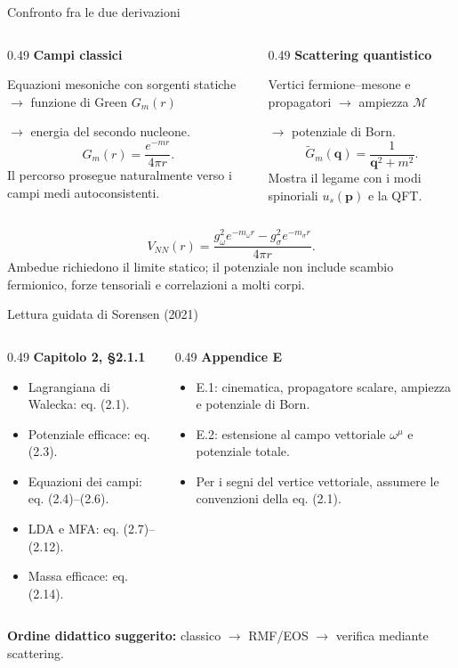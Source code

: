 \begin{frame}{Confronto fra le due derivazioni}
\small
\begin{columns}[T,onlytextwidth]
\begin{column}{0.49\textwidth}
\textbf{Campi classici}\par\smallskip
Equazioni mesoniche con sorgenti statiche
\(\rightarrow\) funzione di Green \(G_m(r)\)\par
\(\rightarrow\) energia del secondo nucleone.
\[
G_m(r)=\frac{e^{-mr}}{4\pi r}.
\]
Il percorso prosegue naturalmente verso
i campi medi autoconsistenti.
\end{column}
\begin{column}{0.49\textwidth}
\textbf{Scattering quantistico}\par\smallskip
Vertici fermione--mesone e propagatori
\(\rightarrow\) ampiezza \(\mathcal M\)\par
\(\rightarrow\) potenziale di Born.
\[
\widetilde G_m(\mathbf q)=\frac1{\mathbf q^2+m^2}.
\]
Mostra il legame con i modi spinoriali
\(u_s(\mathbf p)\) e la QFT.
\end{column}
\end{columns}
\medskip
\[
V_{NN}(r)=\frac{g_\omega^2e^{-m_\omega r}
-g_\sigma^2e^{-m_\sigma r}}{4\pi r}.
\]
Ambedue richiedono il limite statico; il potenziale non include scambio
fermionico, forze tensoriali e correlazioni a molti corpi.
\end{frame}

\begin{frame}{Lettura guidata di Sorensen (2021)}
\small
\begin{columns}[T,onlytextwidth]
\begin{column}{0.49\textwidth}
\textbf{Capitolo 2, \S 2.1.1}\par\smallskip
\begin{itemize}
\item Lagrangiana di Walecka: eq. (2.1).
\item Potenziale efficace: eq. (2.3).
\item Equazioni dei campi: eq. (2.4)--(2.6).
\item LDA e MFA: eq. (2.7)--(2.12).
\item Massa efficace: eq. (2.14).
\end{itemize}
\end{column}
\begin{column}{0.49\textwidth}
\textbf{Appendice E}\par\smallskip
\begin{itemize}
\item E.1: cinematica, propagatore scalare,
ampiezza e potenziale di Born.
\item E.2: estensione al campo vettoriale
\(\omega^\mu\) e potenziale totale.
\item Per i segni del vertice vettoriale,
assumere le convenzioni della eq. (2.1).
\end{itemize}
\end{column}
\end{columns}
\medskip
\textbf{Ordine didattico suggerito:}
classico \(\rightarrow\) RMF/EOS \(\rightarrow\) verifica mediante scattering.
\end{frame}


